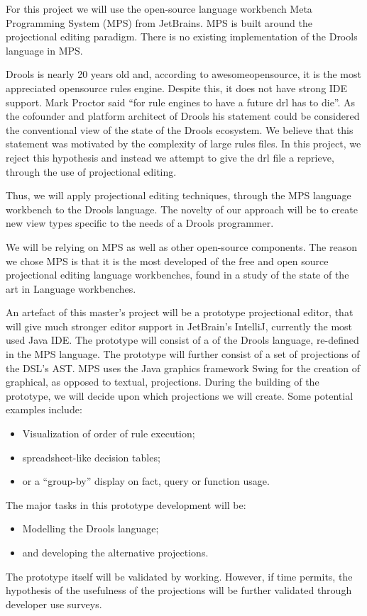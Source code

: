 For this project we will use the open-source language workbench Meta Programming System (MPS) from JetBrains\cite{MPS_ProductPage}.
MPS is built around the projectional editing paradigm.
There is no existing implementation of the Drools language in MPS.

Drools is nearly 20 years old and, according to awesomeopensource\cite{awesomeopensource}, it is the most appreciated opensource rules engine.
Despite this, it does not have strong IDE support.
Mark Proctor said ``for rule engines to have a future drl has to die''\cite{Proctor_happenings}.
As the cofounder and platform architect of Drools his statement could be considered the conventional view of the state of the Drools ecosystem.
We believe that this statement was motivated by the complexity of large rules files.
In this project, we reject this hypothesis and instead we attempt to give the drl file a reprieve, through the use of projectional editing.

Thus, we will apply projectional editing techniques, through the MPS language workbench to the Drools language.
The novelty of our approach will be to create new view types specific to the needs of a Drools programmer.

We will be relying on MPS as well as other open-source components.
The reason we chose MPS is that it is the most developed of the free and open source projectional editing language workbenches, found in a study of the state of the art in Language workbenches\cite{erdweg2013state}.

An artefact of this master's project will be a prototype projectional editor, that will give much stronger editor support in JetBrain's IntelliJ, currently the most used Java IDE\cite{Java_usage_report}.
The prototype will consist of a of the Drools language, re-defined in the MPS language.  
The prototype will further consist of a set of projections of the DSL's AST.
MPS uses the Java graphics framework Swing for the creation of graphical, as opposed to textual, projections.
During the building of the prototype, we will decide upon which projections we will create. 
Some potential examples include:
\begin{itemize}
    \item Visualization of order of rule execution;
    \item spreadsheet-like decision tables;
    \item or a ``group-by'' display on fact, query or function usage.
\end{itemize}

The major tasks in this prototype development will be: 
\begin{itemize}
    \item Modelling the Drools language;
    \item and developing the alternative projections.
\end{itemize}

The prototype itself will be validated by working.
However, if time permits, the hypothesis of the usefulness of the projections will be further validated through developer use surveys.

